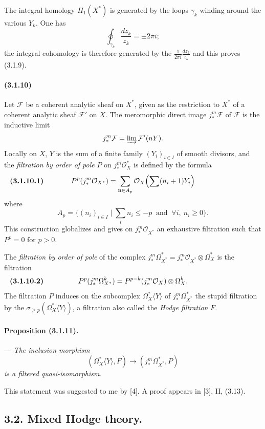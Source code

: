 \documentclass[10pt]{article}
\providecommand{\cO}{\mathcal O}
\providecommand{\cO}{\mathcal O}
\begin{document}
The integral homology $H_1(X^*)$ is generated by the loops $\gamma_k$ winding around the various $Y_k$. One has
\[
\oint_{\gamma_k}\frac{dz_k}{z_k}=\pm2\pi i;
\]
the integral cohomology is therefore generated by the $\frac1{2\pi i}\frac{dz_k}{z_k}$ and this proves (3.1.9).

\paragraph{(3.1.10)} Let $\mathcal F$ be a coherent analytic sheaf on $X^*$, given as the restriction to $X^*$ of a coherent analytic sheaf $\mathcal F'$ on $X$. The meromorphic direct image $j_*^m\mathcal F$ of $\mathcal F$ is the inductive limit
\[
j_*^m\mathcal F=\varinjlim \mathcal F'(nY).
\]
Locally on $X$, $Y$ is the sum of a finite family $(Y_i)_{i\in I}$ of smooth divisors, and the \emph{filtration by order of pole} $P$ on $j_*^m\cO_X^*$ is defined by the formula
\[
\makebox[\textwidth][s]{\textbf{(3.1.10.1)}\hfill$\displaystyle P^p(j_*^m\cO_{X^*})=\sum_{\mathbf n\in A_p}\cO_X\Bigl(\sum(n_i+1)Y_i\Bigr)$\hfill\phantom{\textbf{(3.1.10.1)}}}
\]
where
\[
A_p=\{(n_i)_{i\in I}\mid \sum_i n_i\le -p\ \text{ and }\ \forall i,\ n_i\ge0\}.
\]
This construction globalizes and gives on $j_*^m\cO_{X^*}$ an exhaustive filtration such that $P^p=0$ for $p>0$.

The \emph{filtration by order of pole} of the complex $j_*^m\Omega_{X^*}^*=j_*^m\cO_{X^*}\otimes\Omega_X^*$ is the filtration
\[
\makebox[\textwidth][s]{\textbf{(3.1.10.2)}\hfill$\displaystyle P^p(j_*^m\Omega_{X^*}^k)=P^{p-k}(j_*^m\cO_X)\otimes\Omega_X^k.$\hfill\phantom{\textbf{(3.1.10.2)}}}
\]
The filtration $P$ induces on the subcomplex $\Omega_X^*\langle Y\rangle$ of $j_*^m\Omega_{X^*}^*$ the stupid filtration by the $\sigma_{\ge p}(\Omega_X^*\langle Y\rangle)$, a filtration also called the \emph{Hodge filtration} $F$.

\paragraph{Proposition (3.1.11).} --- {\itshape The inclusion morphism
\[
(\Omega_X^*\langle Y\rangle,F)\longrightarrow(j_*^m\Omega_{X^*}^*,P)
\]
is a filtered quasi-isomorphism.}

This statement was suggested to me by [4]. A proof appears in [3], II, (3.13).

\subsection*{3.2. Mixed Hodge theory.}
\end{document}
